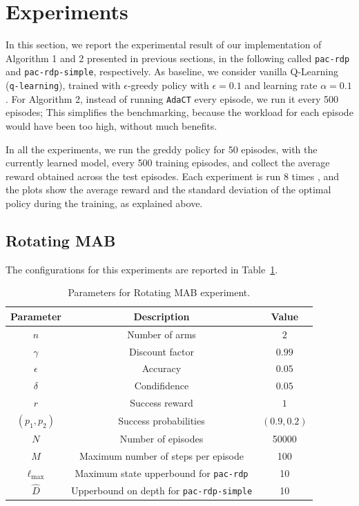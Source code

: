 \documentclass{article}
\begin{document}
\section{Experiments}

In this section, we report the
experimental result of our implementation
of Algorithm 1 and 2 presented in previous sections,
in the following called \texttt{pac-rdp} and \texttt{pac-rdp-simple},
respectively.
As baseline, we consider vanilla Q-Learning (\texttt{q-learning}),
trained with $\epsilon$-greedy policy with $\epsilon=0.1$
and learning rate $\alpha = 0.1$.
For Algorithm 2, instead of running
\texttt{AdaCT} every episode, we
run it every 500 episodes; This simplifies
the benchmarking, because the workload
for each episode would have been too high, without
much benefits.

In all the experiments,
we run the greddy policy for 50 episodes, with the currently learned model,
every 500 training episodes, and collect
the average reward obtained across the test episodes.
Each experiment is run $8$ times
,
and the plots
show the average reward and the standard deviation
of the optimal policy during the training, as explained above.


\subsection{Rotating MAB}

The configurations for this experiments are reported in
Table~\ref{tab:rotmab-params}.

\begin{table}[!h]
\centering
    \begin{tabular}{|c|c|c|}
 \hline
 Parameter & Description & Value \\ \hline \hline
 $n$ & Number of arms & $2$\\ \hline
 $\gamma$ & Discount factor & $0.99$\\ \hline
 $\epsilon$ & Accuracy & $0.05$\\ \hline
 $\delta$ & Condifidence & $0.05$\\ \hline
 $r$ & Success reward & $1$\\ \hline
 $(p_1, p_2)$ & Success probabilities & $(0.9, 0.2)$\\ \hline
 $N$ & Number of episodes & 50000 \\ \hline
 $M$ & Maximum number of steps per episode & 100 \\ \hline
 $\ell_{\max}$ & Maximum state upperbound for \texttt{pac-rdp} & 10 \\ \hline
 $\hat{D}$ & Upperbound on depth for \texttt{pac-rdp-simple} & 10 \\ \hline
\end{tabular}
\caption{Parameters for Rotating MAB experiment.}
 \label{tab:rotmab-params}
\end{table}
\end{document}
